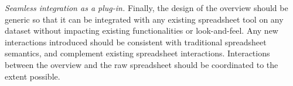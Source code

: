 \item {\em Seamless integration as a plug-in.}
Finally, the design of the overview
should be generic so that it can be integrated
with any existing spreadsheet tool on any 
dataset without impacting
existing functionalities or look-and-feel.
Any new interactions introduced should be consistent
with traditional spreadsheet semantics,
and complement existing spreadsheet interactions.
Interactions between the overview and the raw spreadsheet
should be coordinated to the extent possible.
\squishend
{}

\begin{comment}
Since we want to allow users to control how the overview
is constructed, we can let them select the grouping
attribute(s). Following this, we need mechanisms to automatically group nearby rows
into meaningful bins.
This necessitates
{\em semantic zooming}~\cite{perlin1993pad} instead of geometric
zooming (unlike text editors or presentation software),
on the overview view instead of the detailed view
(unlike map tools).
Several domains, \eg online maps and program visualization,
adopt semantic zooming
to ensure improved readability and
comprehension of the information displayed~\cite{summers2003experimental}.
However, to the best of our knowledge, no prior work
has ever developed semantic zooming for spreadsheet data.
Customizing these bins will also eliminate
visual discontinuities: users can simply arrange the bins
the way they want and keep them near each other
for easy comparison.
For this, we take inspiration from aggregation
in relational databases. In relational databases, each ``group'' is associated
with one or more aggregates. As long as the groups are
appropriately constructed (using the mechanisms alluded to above),
formulae can be issued once without requiring any steering, and
automatically maintained for all groups when
zooming in and zooming out. 
\end{comment}

